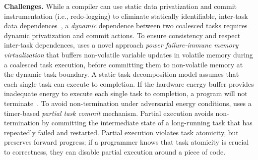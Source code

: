 \textbf{Challenges.} While a compiler can use static data privatization and commit instrumentation
(i.e., redo-logging) to eliminate statically identifiable, inter-task data
dependences~\cite{alpaca}, a \emph{dynamic} dependence between two coalesced
tasks requires dynamic privatization and commit actions.
%
To ensure consistency and respect inter-task dependences, \sys uses a novel
approach \emph{power failure-immune memory virtualization} that buffers non-volatile variable
updates in volatile memory during a coalesced task execution, before committing
them to non-volatile memory at the dynamic task boundary.
%
A static task decomposition model assumes that each
single task can execute to completion. If the hardware energy buffer provides
inadequate energy to execute each single task to completion, a program will not
terminate~\cite{cleancut_2018}. To avoid non-termination under adversarial
energy conditions, \sys uses a timer-based {\em partial task commit} mechanism.
Partial execution avoids non-termination by committing the intermediate state of a long-running
task that has repeatedly failed and restarted. Partial execution violates
task atomicity, but preserves forward progress; if a programmer knows that
task atomicity is crucial to correctness, they can disable partial execution around a piece of code.
%
